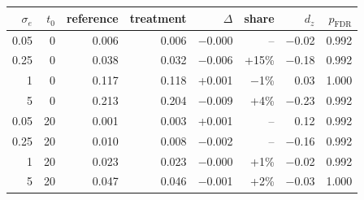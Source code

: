\begin{tabular}{rrrrrrrr}
\toprule
$\sigma_e$ & $t_0$ & reference & treatment & $\Delta$ & share & $d_z$ & $p_{\text{FDR}}$ \\
\midrule
0.05 & 0 & 0.006 & 0.006 & $-$0.000 & -- & $-$0.02 & 0.992 \\
0.25 & 0 & 0.038 & 0.032 & $-$0.006 & +15\% & $-$0.18 & 0.992 \\
1 & 0 & 0.117 & 0.118 & +0.001 & $-$1\% & 0.03 & 1.000 \\
5 & 0 & 0.213 & 0.204 & $-$0.009 & +4\% & $-$0.23 & 0.992 \\
0.05 & 20 & 0.001 & 0.003 & +0.001 & -- & 0.12 & 0.992 \\
0.25 & 20 & 0.010 & 0.008 & $-$0.002 & -- & $-$0.16 & 0.992 \\
1 & 20 & 0.023 & 0.023 & $-$0.000 & +1\% & $-$0.02 & 0.992 \\
5 & 20 & 0.047 & 0.046 & $-$0.001 & +2\% & $-$0.03 & 1.000 \\
\bottomrule
\end{tabular}
